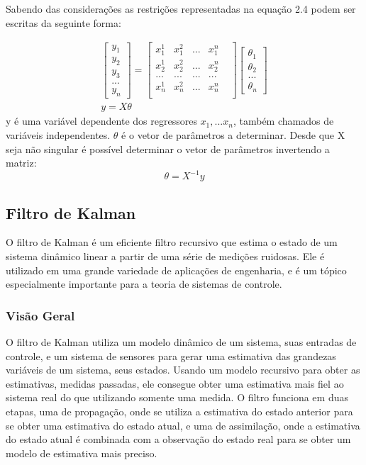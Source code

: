Sabendo das considerações as restrições representadas na equação 2.4 podem ser escritas da seguinte forma:

\begin{equation}
\begin{array}{c}
\begin{bmatrix}
y_1 \\ y_2 \\ y_3\\ ... \\ y_n
\end{bmatrix}
=
\begin{bmatrix}
x^1_1 & x^2_1 & ... & x^n_1\\
x^1_2 & x^2_2 & ... & x^n_2\\
... & ... & ...& ...&\\
x^1_n & x^2_n & ... & x^n_n\\
\end{bmatrix}
\begin{bmatrix}
\theta_1 \\ \theta_2 \\ ... \\ \theta_n
\end{bmatrix}
\\
y=X \theta
\end{array}
\end{equation}
y é uma variável dependente  dos regressores $x_1,... x_n$, também chamados de variáveis independentes. $\theta$ é o vetor de parâmetros a determinar. Desde que X seja não singular é possível determinar o vetor de parâmetros invertendo a matriz:
\begin{equation}
\theta=X^{-1}y
\end{equation}


\subsection {Filtro de Kalman}
O filtro de Kalman é um eficiente filtro recursivo que estima o estado de um sistema dinâmico linear a partir de uma série de medições ruidosas. Ele é utilizado em uma grande variedade de aplicações de engenharia, e é um tópico especialmente importante para a teoria de sistemas de controle.
\subsubsection{Visão Geral}
O filtro de Kalman utiliza um modelo dinâmico de um sistema, suas entradas de controle, e um sistema de sensores para gerar uma estimativa das grandezas variáveis de um sistema, seus estados. Usando um modelo recursivo para obter as estimativas, medidas passadas, ele consegue obter uma estimativa mais fiel ao sistema real do que utilizando somente uma medida. O filtro funciona em duas etapas, uma de propagação, onde se utiliza a estimativa do estado anterior para se obter uma estimativa do estado atual, e uma de assimilação, onde a estimativa do estado atual é combinada com a observação do estado real para se obter um modelo de estimativa mais preciso.


